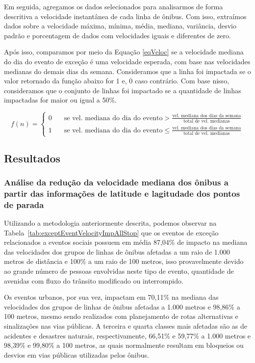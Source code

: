 \documentclass[
	12pt,				%
	oneside,			%
	a4paper,			%
	english,			%
	brazil				%
	]{abntex2ppgsi}
\begin{document}
{{{Em seguida, agregamos os dados selecionados para analisarmos  de forma descritiva a velocidade instantânea de cada linha de ônibus. Com isso, extraímos dados sobre a velocidade máxima, mínima, média, mediana, variância, desvio padrão e porcentagem de dados com velocidades iguais e diferentes de zero. 

Após isso, comparamos por meio da Equação \ref{eqVeloc} se a velocidade mediana do dia do evento de exceção é uma velocidade esperada, com base nas velocidades medianas do demais dias da semana.  Consideramos que a linha foi impactada se o valor retornado da função abaixo for 1 e, 0 caso contrário. Com base nisso, consideramos que o conjunto de linhas foi impactado se a quantidade de linhas impactadas for maior ou igual a 50\%.

\begin{equation}
\label{eqVeloc}
 f(n) =
  \begin{cases}
    0      & \quad \text{se  vel.~mediana~do~dia~do~evento} > \frac{\text{vel.~mediana~dos~dias~da~semana}}{\text{total~de~vel.~medianas}}\\
    1 & \quad \text{se vel.~mediana~do~dia~do~evento} \leq \frac{\text{vel.~mediana~dos~dias~da~semana}}{\text{total~de~vel.~medianas}}
  \end{cases}
\end{equation}

\subsection{Resultados}

\subsubsection{Análise da redução da velocidade mediana dos ônibus a partir das informações de latitude e lagitudade dos pontos de parada}
\label{stopsAnalysis}

Utilizando a metodologia anteriormente descrita, podemos observar na Tabela~\ref{tab:exceptEventVelocityImpAllStop} que os eventos de exceção relacionados a eventos sociais possuem em média 87,04\% de impacto na mediana das velocidades dos grupos de linhas de ônibus afetadas a um raio de 1.000 metros de distância e 100\% a um raio de 100 metros, isso provavelmente devido ao grande número de pessoas envolvidas neste tipo de evento, quantidade de avenidas com fluxo do trânsito modificado ou interrompido.

Os eventos urbanos, por sua vez, impactam em 70,11\% na mediana das velocidades dos grupos de linhas de ônibus afetadas a 1.000 metros e 98,86\% a 100 metros, mesmo sendo realizados com planejamento de rotas alternativas e sinalizações nas vias públicas. A terceira e quarta classes mais afetadas são as de acidentes e desastres naturais, respectivamente, 66,51\% e 59,77\% a 1.000 metros e 98,39\% e 99,80\% a 100 metros, as quais normalmente resultam em bloqueios ou desvios em vias públicas utilizadas pelos ônibus.

}}}
\end{document}
